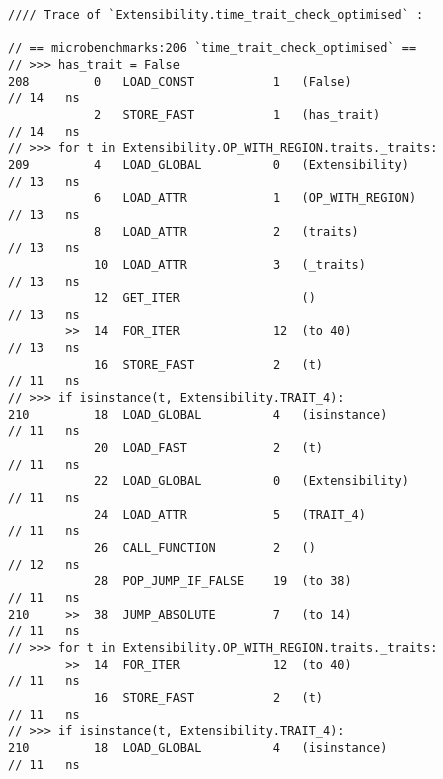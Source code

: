 \begin{code}
    \begin{verbatim}
//// Trace of `Extensibility.time_trait_check_optimised` :

// == microbenchmarks:206 `time_trait_check_optimised` ==
// >>> has_trait = False
208         0   LOAD_CONST           1   (False)                                                    // 14   ns
            2   STORE_FAST           1   (has_trait)                                                // 14   ns
// >>> for t in Extensibility.OP_WITH_REGION.traits._traits:
209         4   LOAD_GLOBAL          0   (Extensibility)                                            // 13   ns
            6   LOAD_ATTR            1   (OP_WITH_REGION)                                           // 13   ns
            8   LOAD_ATTR            2   (traits)                                                   // 13   ns
            10  LOAD_ATTR            3   (_traits)                                                  // 13   ns
            12  GET_ITER                 ()                                                         // 13   ns
        >>  14  FOR_ITER             12  (to 40)                                                    // 13   ns
            16  STORE_FAST           2   (t)                                                        // 11   ns
// >>> if isinstance(t, Extensibility.TRAIT_4):
210         18  LOAD_GLOBAL          4   (isinstance)                                               // 11   ns
            20  LOAD_FAST            2   (t)                                                        // 11   ns
            22  LOAD_GLOBAL          0   (Extensibility)                                            // 11   ns
            24  LOAD_ATTR            5   (TRAIT_4)                                                  // 11   ns
            26  CALL_FUNCTION        2   ()                                                         // 12   ns
            28  POP_JUMP_IF_FALSE    19  (to 38)                                                    // 11   ns
210     >>  38  JUMP_ABSOLUTE        7   (to 14)                                                    // 11   ns
// >>> for t in Extensibility.OP_WITH_REGION.traits._traits:
        >>  14  FOR_ITER             12  (to 40)                                                    // 11   ns
            16  STORE_FAST           2   (t)                                                        // 11   ns
// >>> if isinstance(t, Extensibility.TRAIT_4):
210         18  LOAD_GLOBAL          4   (isinstance)                                               // 11   ns

\end{verbatim}
\end{code}
